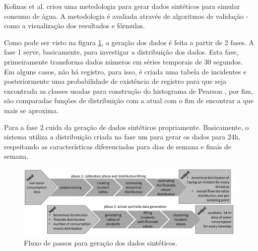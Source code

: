 \documentclass[
	12pt,				%
	openright,			%
	twoside,			%
	a4paper,			%
	english,			%
	brazil				%
	]{abntex2}
\begin{document}
		Kofinas et al. \cite{Kofinas2018} criou uma metedologia para gerar dados sintéticos para simular consumo de água. A metodologia é avaliada através de algoritmos de validação - como a visualização dos resultados e fórmulas.
		\par
		Como pode ser visto na figura \ref{fig:kofinas}, a geração dos dados é feita a partir de 2 fases. A fase 1 serve, basicamente, para investigar a distribuição dos dados. Esta fase, primeiramente transforma dados números em séries temporais de 30 segundos. Em alguns casos, não há registro, para isso, é criada uma tabela de incidentes e posteriormente uma probabilidade de existência de registro para que seja encontrada as classes usadas para construção do histograma de Pearson \cite{dean2009descriptive}, por fim, são comparadas funções de distribuição com a atual com o fim de encontrar a que mais se aproxima.
		\par
		Para a fase 2 cuida da geração de dados sintéticos propriamente. Basicamente, o sistema utiliza a distribuição criada na fase um para gerar os dados para 24h, respeitando as características diferenciadas para dias de semana e finais de semana.
		\begin{figure}[h!]
			\centering
			\includegraphics[width=\linewidth]{./figures/TrabalhosRelacionados/Kofinas21.png}
			\caption{Fluxo de passos para geração dos dados sintéticos.}
			\label{fig:kofinas}
		\end{figure}
\end{document}
